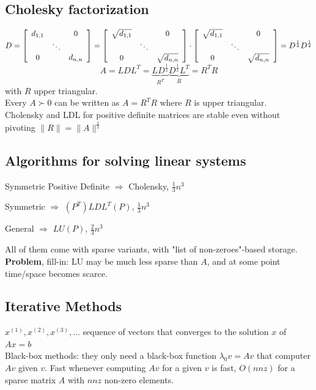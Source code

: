 \documentclass[10pt]{report}
\begin{document}
\subsection{Cholesky factorization} $D = \left[\begin{array}{c c c}
d_{1,1}& & 0\\
& \ddots & \\
0 & & d_{n,n}
\end{array}\right] = \left[\begin{array}{c c c}
\sqrt{d_{1,1}}& & 0\\
& \ddots & \\
0 & & \sqrt{d_{n,n}}
\end{array}\right]\cdot\left[\begin{array}{c c c}
\sqrt{d_{1,1}}& & 0\\
& \ddots & \\
0 & & \sqrt{d_{n,n}}
\end{array}\right] = D^{\frac{1}{2}}D^{\frac{1}{2}}$\\
$$A = LDL^T = \underset{R^T}{\underbrace{LD^{\frac{1}{2}}}}\underset{R}{\underbrace{D^{\frac{1}{2}}L^T}} = R^T R$$ with $R$ upper triangular.\\
Every $A \succ 0$ can be written as $A = R^T R$ where $R$ is upper triangular.\\
Cholensky and LDL for positive definite matrices are stable even without pivoting $\|R\|=\|A\|^{\frac{1}{2}}$
\subsection{Algorithms for solving linear systems}
\begin{list}{}{}
	\item Symmetric Positive Definite $\Rightarrow$ Cholensky, $\frac{1}{3}n^3$
	\item Symmetric $\Rightarrow$ $(P^T)LDL^T(P)$, $\frac{1}{3}n^3$
	\item General $\Rightarrow$ $LU(P)$, $\frac{2}{3}n^3$
\end{list}
All of them come with sparse variants, with "list of non-zeroes"-based storage.\\
\textbf{Problem}, fill-in: LU may be much less sparse than $A$, and at some point time/space becomes scarce.
\subsection{Iterative Methods} $x^{(1)}, x^{(2)}, x^{(3)},\ldots$ sequence of vectors that converges to the solution $x$ of $Ax = b$\\
Black-box methods: they only need a black-box function $\lambda_0v=Av$ that computer $Av$ given $v$. Fast whenever computing $Av$ for a given $v$ is fast, $O(nnz)$ for a sparse matrix $A$ with $nnz$ non-zero elements.
\end{document}
